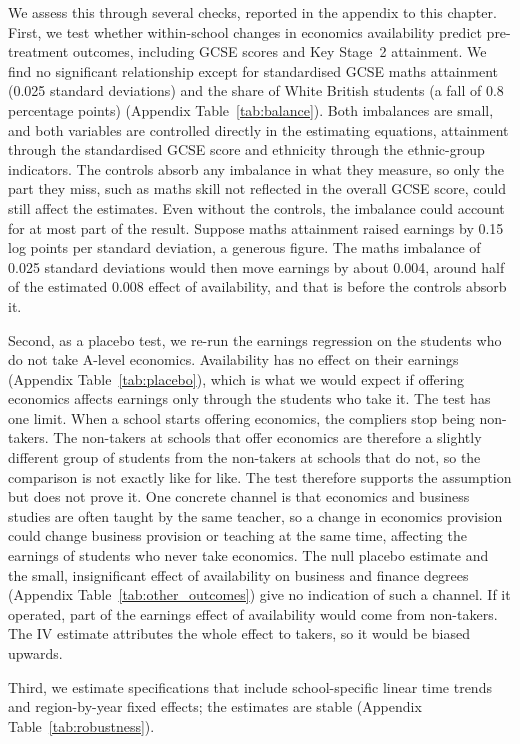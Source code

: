 We assess this through several checks, reported in the appendix to this chapter. First, we test whether within-school changes in economics availability predict pre-treatment outcomes, including GCSE scores and Key Stage~2 attainment. We find no significant relationship except for standardised GCSE maths attainment (0.025 standard deviations) and the share of White British students (a fall of 0.8 percentage points) (Appendix Table~\ref{tab:balance}). Both imbalances are small, and both variables are controlled directly in the estimating equations, attainment through the standardised GCSE score and ethnicity through the ethnic-group indicators. The controls absorb any imbalance in what they measure, so only the part they miss, such as maths skill not reflected in the overall GCSE score, could still affect the estimates. Even without the controls, the imbalance could account for at most part of the result. Suppose maths attainment raised earnings by 0.15 log points per standard deviation, a generous figure. The maths imbalance of 0.025 standard deviations would then move earnings by about 0.004, around half of the estimated 0.008 effect of availability, and that is before the controls absorb it.

Second, as a placebo test, we re-run the earnings regression on the students who do not take A-level economics. Availability has no effect on their earnings (Appendix Table~\ref{tab:placebo}), which is what we would expect if offering economics affects earnings only through the students who take it. The test has one limit. When a school starts offering economics, the compliers stop being non-takers. The non-takers at schools that offer economics are therefore a slightly different group of students from the non-takers at schools that do not, so the comparison is not exactly like for like. The test therefore supports the assumption but does not prove it. One concrete channel is that economics and business studies are often taught by the same teacher, so a change in economics provision could change business provision or teaching at the same time, affecting the earnings of students who never take economics. The null placebo estimate and the small, insignificant effect of availability on business and finance degrees (Appendix Table~\ref{tab:other_outcomes}) give no indication of such a channel. If it operated, part of the earnings effect of availability would come from non-takers. The IV estimate attributes the whole effect to takers, so it would be biased upwards.

Third, we estimate specifications that include school-specific linear time trends and region-by-year fixed effects; the estimates are stable (Appendix Table~\ref{tab:robustness}).


